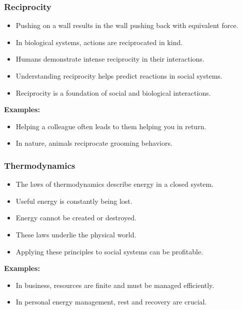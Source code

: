 \begin{frame}[fragile]\frametitle{Reciprocity}
\begin{itemize}
    \item Pushing on a wall results in the wall pushing back with equivalent force.
    \item In biological systems, actions are reciprocated in kind.
    \item Humans demonstrate intense reciprocity in their interactions.
    \item Understanding reciprocity helps predict reactions in social systems.
    \item Reciprocity is a foundation of social and biological interactions.
\end{itemize}
\textbf{Examples:}
\begin{itemize}
    \item Helping a colleague often leads to them helping you in return.
    \item In nature, animals reciprocate grooming behaviors.
\end{itemize}
\end{frame}

\begin{frame}[fragile]\frametitle{Thermodynamics}
\begin{itemize}
    \item The laws of thermodynamics describe energy in a closed system.
    \item Useful energy is constantly being lost.
    \item Energy cannot be created or destroyed.
    \item These laws underlie the physical world.
    \item Applying these principles to social systems can be profitable.
\end{itemize}
\textbf{Examples:}
\begin{itemize}
    \item In business, resources are finite and must be managed efficiently.
    \item In personal energy management, rest and recovery are crucial.
\end{itemize}
\end{frame}

